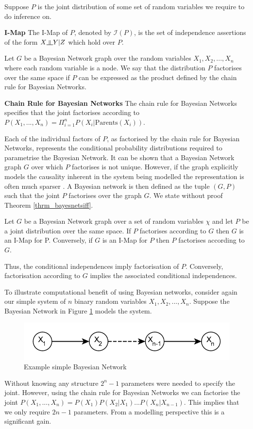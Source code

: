 \documentclass[../masters.tex]{subfiles}
\begin{document}
Suppose $P$ is the joint distribution of some set of random variables we require to do inference on.
\begin{defn}
\textbf{I-Map} The I-Map of $P$, denoted by $\mathcal{I}(P)$, is the set of independence assertions of the form $X \indep Y | Z$ which hold over $P$.
\end{defn} 
Let $G$ be a Bayesian Network graph over the random variables $X_1, X_2,...,X_n$ where each random variable is a node. We say that the distribution $P$ factorises over the same space if $P$ can be expressed as the product defined by the chain rule for Bayesian Networks.
\begin{defn}
\textbf{Chain Rule for Bayesian Networks} The chain rule for Bayesian Networks specifies that the joint factorises according to $P(X_1,...,X_n) = \Pi_{i=1}^n P(X_i | \text{Parents}(X_i))$.
\end{defn}
Each of the individual factors of $P$, as factorised by the chain rule for Bayesian Networks, represents the conditional probability distributions required to parametrise the Bayesian Network. It can be shown that a Bayesian Network graph $G$ over which $P$ factorises is not unique. However, if the graph explicitly models the causality inherent in the system being modelled the representation is often much sparser \cite{koller}. A Bayesian network is then defined as the tuple $(G, P)$ such that the joint $P$ factorises over the graph $G$. We state without proof Theorem \ref{thrm_bayesnetsiff}. 
\begin{thrm}
Let $G$ be a Bayesian Network graph over a set of random variables $\chi$ and let $P$ be a joint distribution over the same space. If $P$ factorises according to $G$ then $G$ is an I-Map for P. Conversely, if $G$ is an I-Map for $P$ then $P$ factorises according to $G$.
\label{thrm_bayesnetsiff}
\end{thrm}
Thus, the conditional independences imply factorisation of $P$. Conversely, factorisation according to $G$ implies the associated conditional independences.

To illustrate computational benefit of using Bayesian networks, consider again our simple system of $n$ binary random variables $X_1,X_2,...,X_n$. Suppose the Bayesian Network in Figure \ref{fig_bnet} models the system.
\begin{figure}[H] 
\centering
\includegraphics[scale=1.0]{bayes_net.pdf}
\caption{Example simple Bayesian Network}
\label{fig_bnet}
\end{figure}
Without knowing any structure $2^{n}-1$ parameters were needed to specify the joint. However, using the chain rule for Bayesian Networks we can factorise the joint $P(X_1,...,X_n) = P(X_1)P(X_2|X_1)...P(X_n|X_{n-1})$. This implies that we only require $2n-1$ parameters. From a modelling perspective this is a significant gain.
\end{document}
